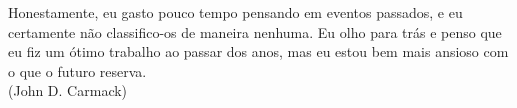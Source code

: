 \thispagestyle{empty}
\begin{center}
%
\end{center}
\vspace{19cm}

\begin{flushright}\footnotesize
Honestamente, eu gasto pouco tempo pensando em eventos passados, e eu
certamente não classifico-os de maneira nenhuma. Eu olho para trás e
penso que eu fiz um ótimo trabalho ao passar dos anos, mas eu estou
bem mais ansioso com o que o futuro reserva.  \\ (John D. Carmack)
\end{flushright}
